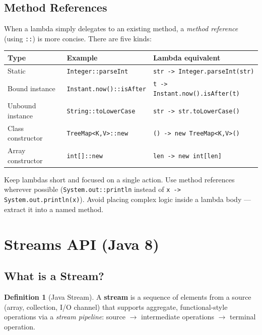 \documentclass[11pt, a4paper, notitlepage]{report}
\theoremstyle{definition}
\newtheorem{definition}[theorem]{Definition}
\theoremstyle{remark}
\theoremstyle{definition}
\begin{document}
\subsection{Method References}
\label{subsec:ch10-method-references}

When a lambda simply delegates to an existing method, a \emph{method reference}
(using \texttt{::}) is more concise.  There are five kinds:

\begin{center}
\begin{tabularx}{\linewidth}{llX}
\toprule
\textbf{Type} & \textbf{Example} & \textbf{Lambda equivalent} \\
\midrule
Static              & \texttt{Integer::parseInt}      & \texttt{str -> Integer.parseInt(str)} \\
Bound instance      & \texttt{Instant.now()::isAfter} & \texttt{t -> Instant.now().isAfter(t)} \\
Unbound instance    & \texttt{String::toLowerCase}    & \texttt{str -> str.toLowerCase()} \\
Class constructor   & \texttt{TreeMap<K,V>::new}      & \texttt{() -> new TreeMap<K,V>()} \\
Array constructor   & \texttt{int[]::new}             & \texttt{len -> new int[len]} \\
\bottomrule
\end{tabularx}
\end{center}

\begin{examtip}[title={Exam Tip: Lambda Best Practices}]
Keep lambdas short and focused on a single action.  Use method references wherever
possible (\texttt{System.out::println} instead of \texttt{x -> System.out.println(x)}).
Avoid placing complex logic inside a lambda body --- extract it into a named method.
\end{examtip}

\section{Streams API (Java 8)}
\label{sec:ch10-streams}

\subsection{What is a Stream?}
\label{subsec:ch10-stream-what}

\begin{definition}[Java Stream]
\label{def:ch10-stream}
A \textbf{stream} is a sequence of elements from a source (array, collection, I/O
channel) that supports aggregate, functional-style operations via a
\emph{stream pipeline}: source $\rightarrow$ intermediate operations $\rightarrow$
terminal operation.
\end{definition}
\end{document}
